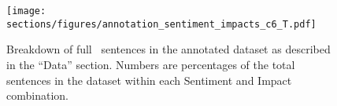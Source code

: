 


\begin{figure}[t]
\centering
\texttt{[image: sections/figures/annotation\_sentiment\_impacts\_c6\_T.pdf]} %
\caption{Breakdown of full \nsentencesNoTBDs\ sentences in the annotated dataset as described in the ``Data'' section.  Numbers are percentages of the total sentences in the dataset within each Sentiment and Impact combination.}
\label{fig:sentiment_impact}
\end{figure}


